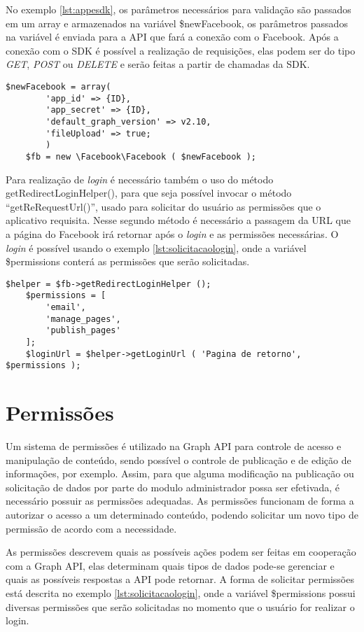 No exemplo \ref{lst:appesdk}, os parâmetros necessários para validação são passados em um array e armazenados na variável \$newFacebook, os parâmetros passados na variável é enviada para a API que fará a conexão com o Facebook. Após a conexão com o SDK é possível a realização de requisições, elas podem ser do tipo \textit{GET}, \textit{POST} ou \textit{DELETE} e serão feitas a partir de chamadas da SDK.

\begin{lstlisting}[caption={Conexão entre aplicativo e SDK},label={lst:appesdk}]
	$newFacebook = array(
		'app_id' => {ID},
		'app_secret' => {ID},
		'default_graph_version' => v2.10,
		'fileUpload' => true;
		)
	$fb = new \Facebook\Facebook ( $newFacebook );
\end{lstlisting}

Para realização de \textit{login} é necessário também o uso do método getRedirectLoginHelper(), para que seja possível invocar o método ``getReRequestUrl()'', usado para solicitar do usuário as permissões que o aplicativo requisita. Nesse segundo método é necessário a passagem da URL que a página do Facebook irá retornar após o \textit{login} e as permissões necessárias. O \textit{login} é possível usando o exemplo \ref{lst:solicitacaologin}, onde a variável \$permissions conterá as permissões que serão solicitadas.

\begin{lstlisting}[caption={Solicitação de Login},label={lst:solicitacaologin}]
	$helper = $fb->getRedirectLoginHelper ();
	$permissions = [
		'email',
		'manage_pages',
		'publish_pages'
	];
	$loginUrl = $helper->getLoginUrl ( 'Pagina de retorno', $permissions );
\end{lstlisting}

\section{Permissões}
\label{sec:permissoes}
Um sistema de permissões é utilizado na Graph API para controle de acesso e manipulação de conteúdo, sendo possível o controle de publicação e de edição de informações, por exemplo. Assim, para que alguma modificação na publicação ou solicitação de dados por parte do modulo administrador possa ser efetivada, é necessário possuir as permissões adequadas. As permissões funcionam de forma a autorizar o acesso a um determinado conteúdo, podendo solicitar um novo tipo de permissão de acordo com a necessidade.

As permissões descrevem quais as possíveis ações podem ser feitas em cooperação com a Graph API, elas determinam quais tipos de dados pode-se gerenciar e quais as possíveis respostas a API pode retornar. A forma de solicitar permissões está descrita no exemplo \ref{lst:solicitacaologin}, onde a variável \$permissions possui diversas permissões que serão solicitadas no momento que o usuário for realizar o login.

